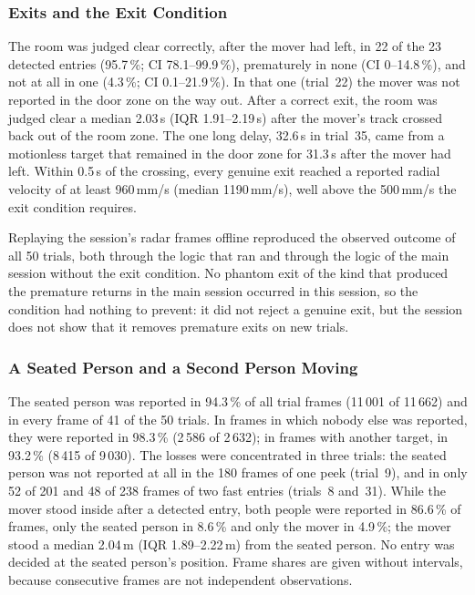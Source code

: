 \subsubsection{Exits and the Exit Condition}

The room was judged clear correctly, after the mover had left, in 22 of the
23 detected entries (95.7\,\%; CI 78.1--99.9\,\%), prematurely in none (CI
0--14.8\,\%), and not at all in one (4.3\,\%; CI 0.1--21.9\,\%). In that one
(trial~22) the mover was not reported in the door zone on the way out. After a
correct exit, the room was judged clear a median 2.03\,s (IQR 1.91--2.19\,s)
after the mover's track crossed back out of the room zone. The one long delay,
32.6\,s in trial~35, came from a motionless target that remained in the door
zone for 31.3\,s after the mover had left. Within 0.5\,s of the crossing,
every genuine exit reached a reported radial velocity of at least
960\,mm/s (median 1190\,mm/s), well above the 500\,mm/s the exit condition
requires.

Replaying the session's radar frames offline reproduced the observed outcome
of all 50 trials, both through the logic that ran and through the logic of the
main session without the exit condition. No phantom exit of the kind that
produced the premature returns in the main session occurred in this session,
so the condition had nothing to prevent: it did not reject a genuine exit, but
the session does not show that it removes premature exits on new trials.

\subsubsection{A Seated Person and a Second Person Moving}

The seated person was reported in 94.3\,\% of all trial frames (11\,001 of
11\,662) and in every frame of 41 of the 50 trials. In frames in which nobody
else was reported, they were reported in 98.3\,\% (2\,586 of 2\,632); in
frames with another target, in 93.2\,\% (8\,415 of 9\,030). The losses were
concentrated in three trials: the seated person was not reported at all in the
180 frames of one peek (trial~9), and in only 52 of 201 and 48 of 238 frames of
two fast entries (trials~8 and~31). While the mover stood inside after a
detected entry, both people were reported in 86.6\,\% of frames, only the
seated person in 8.6\,\% and only the mover in 4.9\,\%; the mover stood a median
2.04\,m (IQR 1.89--2.22\,m) from the seated person. No entry was decided at
the seated person's position. Frame shares are given without intervals,
because consecutive frames are not independent observations.

